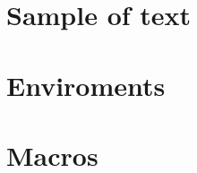 \documentclass[14pt]{extbook} %
\def \SourceRootPath{.}
\begin{document}
\listoftables




\mainmatter 

\cleardoublepage %
\pagestyle{fancy} %


\part{Sample of text}



\part{Enviroments}




\part{Macros}





\backmatter
\end{document}
